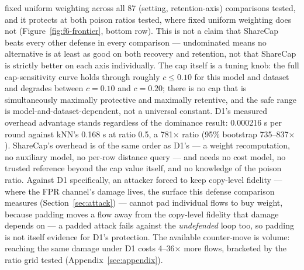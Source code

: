 fixed uniform weighting across all 87 (setting, retention-axis) comparisons tested, and it
protects at both poison ratios tested, where fixed uniform weighting does not
(Figure~\ref{fig:f6-frontier}, bottom row). This is not a claim that ShareCap beats every other
defense in every comparison — undominated means no alternative is at least as good on both
recovery and retention, not that ShareCap is strictly better on each axis individually. The cap
itself is a tuning knob: the full cap-sensitivity curve holds through roughly $c\le0.10$ for
this model and dataset and degrades between $c=0.10$ and $c=0.20$; there is no cap that is
simultaneously maximally protective and maximally retentive, and the safe range is
model-and-dataset-dependent, not a universal constant.
D1's measured overhead advantage stands regardless of the dominance result: 0.000216 s per
round against kNN's 0.168 s at ratio 0.5, a 781$\times$ ratio (95\% bootstrap 735--837$\times$).
ShareCap's overhead is of the same order as D1's — a weight recomputation, no auxiliary model,
no per-row distance query — and needs no cost model, no trusted reference beyond the cap value
itself, and no knowledge of the poison ratio.
Against D1 specifically, an attacker forced to keep copy-level fidelity — where the FPR channel's
damage lives, the surface this defense comparison measures (Section~\ref{sec:attack}) — cannot
pad individual flows to buy weight, because padding moves a flow away from the copy-level
fidelity that damage depends on — a padded attack fails against the \emph{undefended} loop too,
so padding is not itself evidence for D1's protection.
The available counter-move is volume: reaching the same damage under D1 costs 4--36$\times$
more flows, bracketed by the ratio grid tested (Appendix~\ref{sec:appendix}).

